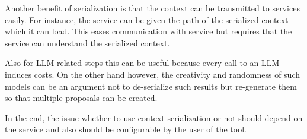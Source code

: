 Another benefit of serialization is that the context can be transmitted to services easily. For instance, the service can be given the path of the serialized context which it can load. This eases communication with service  but requires that the service can understand the serialized context. 

Also for \ac{LLM}-related steps this can be useful because every call to an \ac{LLM} induces costs. On the other hand however, the creativity and randomness of such models can be an argument not to de-serialize such results but re-generate them so that multiple proposals can be created.



In the end, the issue whether to use context serialization or not should depend on the service and also should be configurable by the user of the tool. 

